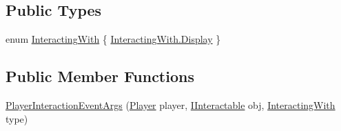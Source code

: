 \subsection*{Public Types}
\begin{DoxyCompactItemize}
\item 
enum \mbox{\hyperlink{class_player_interaction_event_args_a5ee5b290c0a1c78cd0496cad571933d2}{Interacting\+With}} \{ \mbox{\hyperlink{class_player_interaction_event_args_a5ee5b290c0a1c78cd0496cad571933d2ab9987a246a537f4fe86f1f2e3d10dbdb}{Interacting\+With.\+Display}}
 \}
\end{DoxyCompactItemize}
\subsection*{Public Member Functions}
\begin{DoxyCompactItemize}
\item 
\mbox{\hyperlink{class_player_interaction_event_args_ab67ebc6a7a2d9d4a618a59154d21ea99}{Player\+Interaction\+Event\+Args}} (\mbox{\hyperlink{class_player}{Player}} player, \mbox{\hyperlink{interface_i_interactable}{I\+Interactable}} obj, \mbox{\hyperlink{class_player_interaction_event_args_a5ee5b290c0a1c78cd0496cad571933d2}{Interacting\+With}} type)
\end{DoxyCompactItemize}
